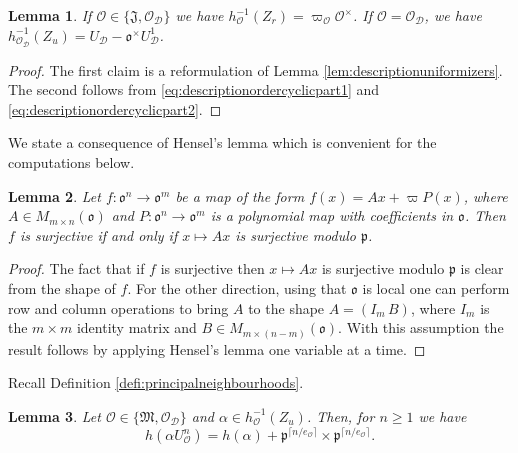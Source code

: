 \documentclass{article}
\newtheorem{lem}{Lemma}[section]
\theoremstyle{named}
\newcommand{\D}{\mathcal{D}}
\newcommand{\M}{\mathfrak{M}}
\newcommand{\J}{\mathfrak{J}}
\renewcommand{\O}{\mathcal{O}}
\renewcommand{\o}{\mathfrak{o}}
\newcommand{\p}{\mathfrak{p}}
\begin{document}
\begin{lem}\label{lem:preimagesramifiedunramified}
If $\O \in \{\J, \O_\D\}$ we have $h_\O^{-1}(Z_r) = \varpi_\O \O^\times$. If $\O = \O_\D$, we have $h_{\O_\D}^{-1}(Z_u) = U_\D - \o^\times U_\D^1$. 
\end{lem}
\begin{proof}
The first claim is a reformulation of Lemma \ref{lem:descriptionuniformizers}. The second follows from \eqref{eq:descriptionordercyclicpart1} and \eqref{eq:descriptionordercyclicpart2}. 
\end{proof}

We state a consequence of Hensel's lemma which is convenient for the computations below.
\begin{lem}\label{lem:auxiliaryhensel}
Let $f: \o^n \rightarrow \o^m$ be a map of the form $f(x) = Ax + \varpi P(x)$, where $A \in M_{m \times n}(\o)$ and $P: \o^n \rightarrow \o^m$ is a polynomial map with coefficients in $\o$. Then $f$ is surjective if and only if $x\mapsto Ax$ is surjective modulo $\p$.
\end{lem}
\begin{proof}
The fact that if $f$ is surjective then $x \mapsto Ax$ is surjective modulo $\p$ is clear from the shape of $f$. For the other direction, using that $\o$ is local one can perform row and column operations to bring $A$ to the shape $A = (I_m \, B)$, where $I_m$ is the $m\times m$ identity matrix and $B \in M_{m \times (n - m)}(\o)$. With this assumption the result follows by applying Hensel's lemma one variable at a time.
\end{proof}

Recall Definition \ref{defi:principalneighbourhoods}.

\begin{lem}\label{lem:charpolyunramified}
Let $\O \in \{\M, \O_\D\}$ and $\alpha \in h_\O^{-1}(Z_u)$. Then, for $n \geq 1$ we have 
\begin{equation*}
    h(\alpha U_\O^n) = h(\alpha) + \p^{\lceil n/e_\O\rceil} \times \p^{\lceil n/e_\O\rceil}.
\end{equation*}
\end{lem}
\end{document}
